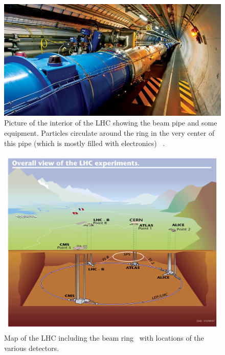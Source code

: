 	
			\begin{figure}[h]
\begin{center}
\includegraphics[width=0.8\linewidth]{Figs/lhc_beampipe.jpg}
\caption{\label{fig:lhc_beampipe}
Picture of the interior of the LHC showing the beam pipe and some equipment. Particles circulate around the ring in the very center of this pipe (which is mostly filled with electronics) ~\cite{cernlhc}.
}
\end{center}
\end{figure} 
			

\begin{figure}[h]
\begin{center}
\includegraphics[width=0.9\linewidth]{Figs/lhclayout.jpg}
\caption{\label{fig:lhclayout}
Map of the LHC including the beam ring~\cite{lhclayout} with locations of the various detectors.
}
\end{center}
\end{figure} 
	
	
